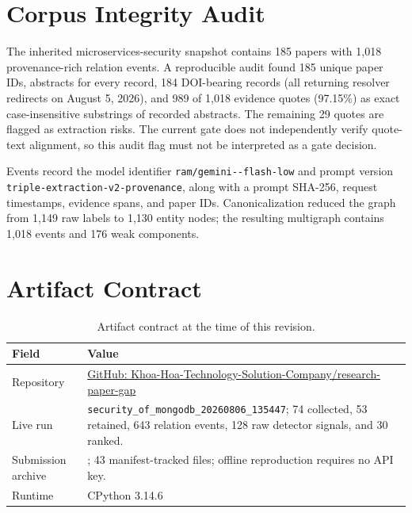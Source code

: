 \documentclass[conference, onecolumn]{IEEEtran}
\begin{document}
\section{Corpus Integrity Audit}
\label{app:corpus}

The inherited microservices-security snapshot contains 185 papers with 1,018 provenance-rich relation events. A reproducible audit found 185 unique paper IDs, abstracts for every record, 184 DOI-bearing records (all returning resolver redirects on August 5, 2026), and 989 of 1,018 evidence quotes (97.15\%) as exact case-insensitive substrings of recorded abstracts. The remaining 29 quotes are flagged as extraction risks. The current gate does not independently verify quote-text alignment, so this audit flag must not be interpreted as a gate decision.

Events record the model identifier
\texttt{ram/\allowbreak gemini--flash-low}
and prompt version
\texttt{triple-\allowbreak extraction-\allowbreak v2-\allowbreak provenance},
along with a prompt SHA-256, request timestamps, evidence spans, and paper IDs.
Canonicalization reduced the graph from 1,149 raw labels to 1,130 entity nodes; the resulting multigraph contains 1,018 events and 176 weak components.

\section{Artifact Contract}
\label{app:artifact}

\begin{table}[h]
\caption{Artifact contract at the time of this revision.}
\label{tab:artifact}
\centering
\begin{tabular}{L{3.2cm}L{8.0cm}}
\toprule
Field & Value\\
\midrule
Repository & \href{https://github.com/Khoa-Hoa-Technology-Solution-Company/research-paper-gap}{GitHub: Khoa-Hoa-Technology-Solution-Company/research-paper-gap}\\
Live run & \texttt{security\_of\_mongodb\_20260806\_135447}; 74 collected, 53 retained, 643 relation events, 128 raw detector signals, and 30 ranked.\\
Submission archive & ; 43 manifest-tracked files; offline reproduction requires no API key.\\
Runtime & CPython 3.14.6\\
\bottomrule
\end{tabular}
\end{table}
\end{document}
